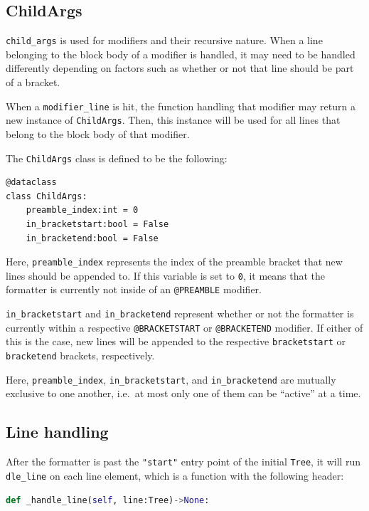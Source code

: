 \subsection{ChildArgs}

\verb|child_args| is used for modifiers and their recursive nature. When a line belonging to the block body of a modifier is handled, it may need to be handled differently depending on factors such as whether or not that line should be part of a bracket. 

When a \verb|modifier_line| is hit, the function handling that modifier may return a new instance of \verb|ChildArgs|. Then, this instance will be used for all lines that belong to the block body of that modifier. 

The \verb|ChildArgs| class is defined to be the following:

\begin{lstlisting}
@dataclass
class ChildArgs:
    preamble_index:int = 0
    in_bracketstart:bool = False
    in_bracketend:bool = False
\end{lstlisting}

Here, \verb|preamble_index| represents the index of the preamble bracket that new lines should be appended to. If this variable is set to \verb|0|, it means that the formatter is currently not inside of an \verb|@PREAMBLE| modifier. 

\verb|in_bracketstart| and \verb|in_bracketend| represent whether or not the formatter is currently within a respective \verb|@BRACKETSTART| or \verb|@BRACKETEND| modifier. If either of this is the case, new lines will be appended to the respective \verb|bracketstart| or \verb|bracketend| brackets, respectively.

Here, \verb|preamble_index|, \verb|in_bracketstart|, and \verb|in_bracketend| are mutually exclusive to one another, i.e.\ at most only one of them can be ``active'' at a time.

\subsection{Line handling}

After the formatter is past the \verb|"start"| entry point of the initial \verb|Tree|, it will run \verb|dle_line| on each line element, which is a function with the following header:

\begin{lstlisting}[language=Python]
def _handle_line(self, line:Tree)->None:
\end{lstlisting}

